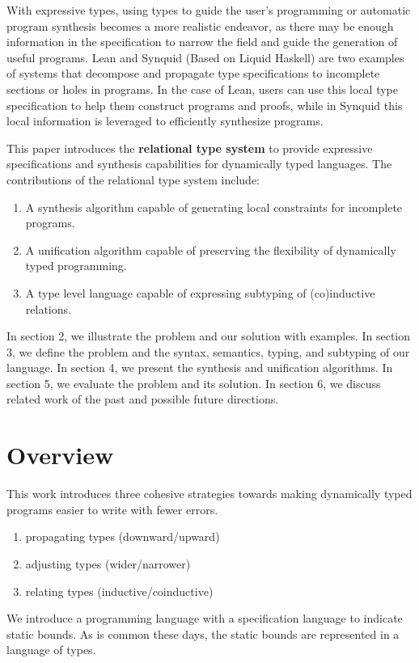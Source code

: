 \documentclass[manuscript]{acmart}
\begin{document}
With expressive types, using types to guide the user's programming or automatic program synthesis 
becomes a more realistic endeavor, as there may be enough information in the specification to narrow the field
and guide the generation of useful programs. Lean and Synquid\cite{} (Based on Liquid Haskell) 
are two examples of systems that decompose and propagate type specifications 
to incomplete sections or holes in programs. 
In the case of Lean, users can use this local type specification to help them construct programs and proofs,
while in Synquid this local information is leveraged to efficiently synthesize programs. 

This paper introduces the \textbf{relational type system} to provide expressive specifications 
and synthesis capabilities for dynamically typed languages. 
The contributions of the relational type system include:
\begin{enumerate}
  \item A synthesis algorithm capable of generating local constraints for incomplete programs. 
  \item A unification algorithm capable of preserving the flexibility of dynamically typed programming. 
  \item A type level language capable of expressing subtyping of (co)inductive relations. 
\end{enumerate}



In section 2, we illustrate the problem and our solution with examples.
In section 3, we define the problem and the syntax, semantics, typing, and subtyping of our language.
In section 4, we present the synthesis and unification algorithms.
In section 5, we evaluate the problem and its solution. 
In section 6, we discuss related work of the past and possible future directions. 

\section{Overview}

This work introduces three cohesive strategies towards making
dynamically typed programs easier to write with fewer errors.  
\begin{enumerate}
  \item propagating types (downward/upward) 
  \item adjusting types (wider/narrower) 
  \item relating types (inductive/coinductive) 
\end{enumerate}
We introduce a programming language with a specification language to indicate static bounds. 
As is common these days, the static bounds are represented in a language of types.
\end{document}
